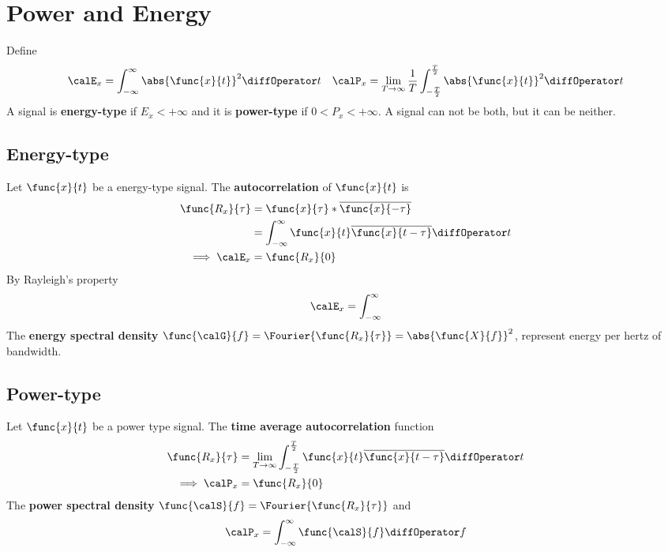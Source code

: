 \section{Power and Energy}
Define 
\begin{align*}
    \calE_x = \int_{-\infty}^{\infty} \abs{\func{x}{t}}^2 \diffOperator t & & \calP_x = \lim_{T \to \infty} \dfrac{1}{T} \int_{-\frac{T}{2}}^{\frac{T}{2}} \abs{\func{x}{t}}^2 \diffOperator t
\end{align*}
A signal is \textbf{energy-type} if \(E_x < + \infty\) and it is \textbf{power-type} if \(0 < P_x < +\infty\). A signal can not be both, but it can be neither.
\subsection{Energy-type}
Let \(\func{x}{t}\) be a energy-type signal. The \textbf{autocorrelation} of \(\func{x}{t}\) is 
\begin{align*}
    \func{R_x}{\tau} &= \func{x}{\tau} \ast \overline{\func{x}{-\tau}} \\
    &= \int_{-\infty}^{\infty} \func{x}{t} \overline{\func{x}{t - \tau}} \diffOperator t\\
    \implies \calE_x &= \func{R_x}{0}
\end{align*}
By Rayleigh's property 
\begin{equation*}
    \calE_x = \int_{-\infty}^{\infty}
\end{equation*}
The \textbf{energy spectral density} \(\func{\calG}{f} = \Fourier{\func{R_x}{\tau}} = \abs{\func{X}{f}}^2\), represent energy per hertz of bandwidth. 
\subsection{Power-type}
Let \(\func{x}{t}\) be a power type signal. The \textbf{time average autocorrelation} function 
\begin{align*}
    \func{R_{x}}{\tau} &= \lim_{T \to \infty} \int_{-\frac{T}{2}}^{\frac{T}{2}} \func{x}{t} \overline{\func{x}{t - \tau}} \diffOperator t\\
    \implies \calP_x &= \func{R_x}{0}
\end{align*}
The \textbf{power spectral density} \(\func{\calS}{f} = \Fourier{\func{R_x}{\tau}}\) and 
\begin{equation*}
    \calP_x = \int_{-\infty}^{\infty} \func{\calS}{f} \diffOperator f
\end{equation*}

